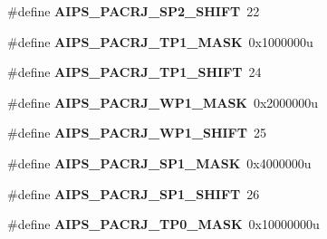 \begin{DoxyCompactItemize}
\item 
\#define {\bfseries A\+I\+P\+S\+\_\+\+P\+A\+C\+R\+J\+\_\+\+S\+P2\+\_\+\+S\+H\+I\+FT}~22\hypertarget{group__AIPS__Register__Masks_gadeec53186f683101a52f41a619299ef0}{}\label{group__AIPS__Register__Masks_gadeec53186f683101a52f41a619299ef0}

\item 
\#define {\bfseries A\+I\+P\+S\+\_\+\+P\+A\+C\+R\+J\+\_\+\+T\+P1\+\_\+\+M\+A\+SK}~0x1000000u\hypertarget{group__AIPS__Register__Masks_ga193a682c0aca79f08cd27f56bccd2e13}{}\label{group__AIPS__Register__Masks_ga193a682c0aca79f08cd27f56bccd2e13}

\item 
\#define {\bfseries A\+I\+P\+S\+\_\+\+P\+A\+C\+R\+J\+\_\+\+T\+P1\+\_\+\+S\+H\+I\+FT}~24\hypertarget{group__AIPS__Register__Masks_ga888db72e1839a2009974c88da81cc340}{}\label{group__AIPS__Register__Masks_ga888db72e1839a2009974c88da81cc340}

\item 
\#define {\bfseries A\+I\+P\+S\+\_\+\+P\+A\+C\+R\+J\+\_\+\+W\+P1\+\_\+\+M\+A\+SK}~0x2000000u\hypertarget{group__AIPS__Register__Masks_ga1f954299ed96c89625f8767365dcdbdd}{}\label{group__AIPS__Register__Masks_ga1f954299ed96c89625f8767365dcdbdd}

\item 
\#define {\bfseries A\+I\+P\+S\+\_\+\+P\+A\+C\+R\+J\+\_\+\+W\+P1\+\_\+\+S\+H\+I\+FT}~25\hypertarget{group__AIPS__Register__Masks_gade30656b93fd7acb64b5168ccf471a2c}{}\label{group__AIPS__Register__Masks_gade30656b93fd7acb64b5168ccf471a2c}

\item 
\#define {\bfseries A\+I\+P\+S\+\_\+\+P\+A\+C\+R\+J\+\_\+\+S\+P1\+\_\+\+M\+A\+SK}~0x4000000u\hypertarget{group__AIPS__Register__Masks_gaf81780b0d6a382fd4c3451f2dd1c8671}{}\label{group__AIPS__Register__Masks_gaf81780b0d6a382fd4c3451f2dd1c8671}

\item 
\#define {\bfseries A\+I\+P\+S\+\_\+\+P\+A\+C\+R\+J\+\_\+\+S\+P1\+\_\+\+S\+H\+I\+FT}~26\hypertarget{group__AIPS__Register__Masks_ga528b1a6930491ad806bde225f2076dae}{}\label{group__AIPS__Register__Masks_ga528b1a6930491ad806bde225f2076dae}

\item 
\#define {\bfseries A\+I\+P\+S\+\_\+\+P\+A\+C\+R\+J\+\_\+\+T\+P0\+\_\+\+M\+A\+SK}~0x10000000u\hypertarget{group__AIPS__Register__Masks_gac789e0900f2bb960cddd5a2868558174}{}\label{group__AIPS__Register__Masks_gac789e0900f2bb960cddd5a2868558174}


\end{DoxyCompactItemize}
